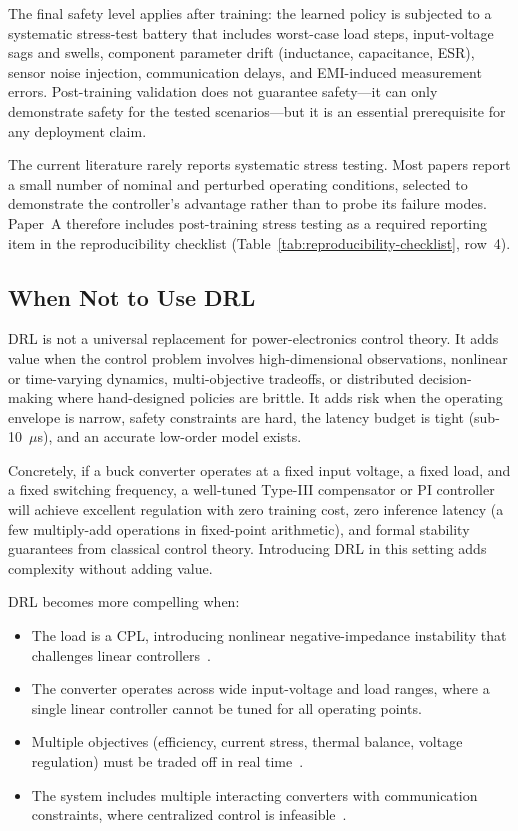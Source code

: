 \documentclass[manuscript,screen,review]{acmart}
\begin{document}
The final safety level applies after training: the learned policy is subjected to a systematic stress-test battery that includes worst-case load steps, input-voltage sags and swells, component parameter drift (inductance, capacitance, ESR), sensor noise injection, communication delays, and EMI-induced measurement errors.
Post-training validation does not guarantee safety---it can only demonstrate safety for the tested scenarios---but it is an essential prerequisite for any deployment claim.

The current literature rarely reports systematic stress testing.
Most papers report a small number of nominal and perturbed operating conditions, selected to demonstrate the controller's advantage rather than to probe its failure modes.
Paper~A therefore includes post-training stress testing as a required reporting item in the reproducibility checklist (Table~\ref{tab:reproducibility-checklist}, row~4).

\subsection{When Not to Use DRL}

DRL is not a universal replacement for power-electronics control theory.
It adds value when the control problem involves high-dimensional observations, nonlinear or time-varying dynamics, multi-objective tradeoffs, or distributed decision-making where hand-designed policies are brittle.
It adds risk when the operating envelope is narrow, safety constraints are hard, the latency budget is tight (sub-10~$\mu$s), and an accurate low-order model exists.

Concretely, if a buck converter operates at a fixed input voltage, a fixed load, and a fixed switching frequency, a well-tuned Type-III compensator or PI controller will achieve excellent regulation with zero training cost, zero inference latency (a few multiply-add operations in fixed-point arithmetic), and formal stability guarantees from classical control theory.
Introducing DRL in this setting adds complexity without adding value.

DRL becomes more compelling when:
\begin{itemize}
  \item The load is a CPL, introducing nonlinear negative-impedance instability that challenges linear controllers~\cite{huangfu2022learning}.
  \item The converter operates across wide input-voltage and load ranges, where a single linear controller cannot be tuned for all operating points.
  \item Multiple objectives (efficiency, current stress, thermal balance, voltage regulation) must be traded off in real time~\cite{jiang2023stability}.
  \item The system includes multiple interacting converters with communication constraints, where centralized control is infeasible~\cite{zeng2022autonomous}.
\end{itemize}
\end{document}
